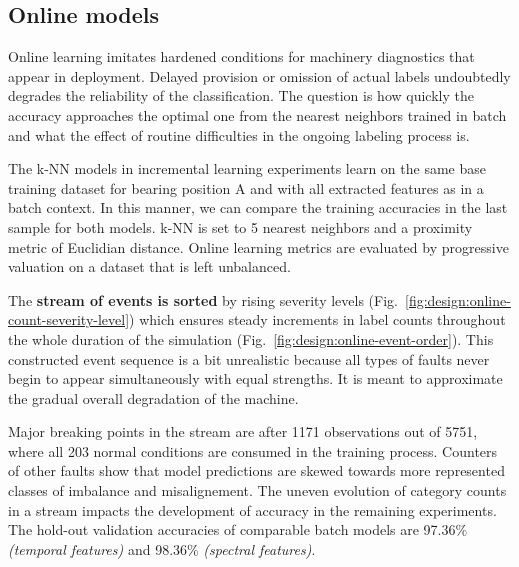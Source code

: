 \clearpage
\subsection{Online models}
Online learning imitates hardened conditions for machinery diagnostics that appear in deployment. Delayed provision or omission of actual labels undoubtedly degrades the reliability of the classification. The question is how quickly the accuracy approaches the optimal one from the nearest neighbors trained in batch and what the effect of routine difficulties in the ongoing labeling process is.

The k-NN models in incremental learning experiments learn on the same base training dataset for bearing position A and with all extracted features as in a batch context. In this manner, we can compare the training accuracies in the last sample for both models. k-NN is set to 5 nearest neighbors and a proximity metric of Euclidian distance. Online learning metrics are evaluated by progressive valuation on a dataset that is left unbalanced.

The \textbf{stream of events is sorted} by rising severity levels (Fig.~\ref{fig:design:online-count-severity-level}) which ensures steady increments in label counts throughout the whole duration of the simulation (Fig.~\ref{fig:design:online-event-order}). This constructed event sequence is a bit unrealistic because all types of faults never begin to appear simultaneously with equal strengths. It is meant to approximate the gradual overall degradation of the machine.


Major breaking points in the stream are after 1171 observations out of 5751, where all 203 normal conditions are consumed in the training process. Counters of other faults show that model predictions are skewed towards more represented classes of imbalance and misalignement. The uneven evolution of category counts in a stream impacts the development of accuracy in the remaining experiments. The hold-out validation accuracies of comparable batch models are 97.36\% \emph{(temporal features)} and 98.36\% \emph{(spectral features)}.
	
